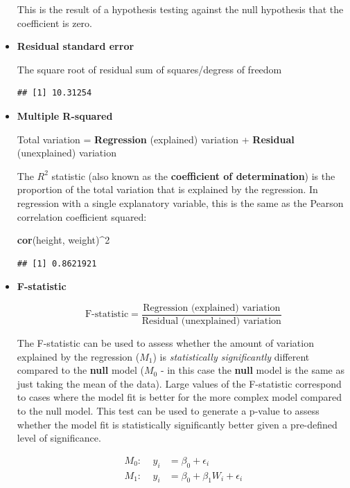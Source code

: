 \documentclass[]{book}
\newenvironment{Shaded}{\begin{snugshade}}{\end{snugshade}}
\newcommand{\KeywordTok}[1]{\textcolor[rgb]{0.13,0.29,0.53}{\textbf{#1}}}
\newcommand{\DecValTok}[1]{\textcolor[rgb]{0.00,0.00,0.81}{#1}}
\newcommand{\StringTok}[1]{\textcolor[rgb]{0.31,0.60,0.02}{#1}}
\newcommand{\OperatorTok}[1]{\textcolor[rgb]{0.81,0.36,0.00}{\textbf{#1}}}
\newcommand{\NormalTok}[1]{#1}
\theoremstyle{definition}
\theoremstyle{definition}
\theoremstyle{definition}
\theoremstyle{remark}
\begin{document}
\begin{itemize}
  This is the result of a hypothesis testing against the null hypothesis
  that the coefficient is zero.
\item
  \textbf{Residual standard error}

  The square root of residual sum of squares/degress of freedom

\begin{Shaded}
\end{Shaded}

\begin{verbatim}
## [1] 10.31254
\end{verbatim}
\item
  \textbf{Multiple R-squared}

  Total variation = \textbf{Regression} (explained) variation +
  \textbf{Residual} (unexplained) variation

  The \(R^2\) statistic (also known as the \textbf{coefficient of
  determination}) is the proportion of the total variation that is
  explained by the regression. In regression with a single explanatory
  variable, this is the same as the Pearson correlation coefficient
  squared:

\begin{Shaded}
\begin{Highlighting}[]
\KeywordTok{cor}\NormalTok{(height, weight)}\OperatorTok{^}\DecValTok{2}
\end{Highlighting}
\end{Shaded}

\begin{verbatim}
## [1] 0.8621921
\end{verbatim}
\item
  \textbf{F-statistic}

  \[
  \text{F-statistic} = \frac{\text{Regression (explained) variation}}{\text{Residual (unexplained) variation}}
  \]

  The F-statistic can be used to assess whether the amount of variation
  explained by the regression (\(M_1\)) is \emph{statistically
  significantly} different compared to the \textbf{null} model (\(M_0\)
  - in this case the \textbf{null} model is the same as just taking the
  mean of the data). Large values of the F-statistic correspond to cases
  where the model fit is better for the more complex model compared to
  the null model. This test can be used to generate a p-value to assess
  whether the model fit is statistically significantly better given a
  pre-defined level of significance.

  \[
  \begin{aligned}
  M_0:~~~~~y_i &= \beta_0 + \epsilon_i\\  
  M_1:~~~~~y_i &= \beta_0 + \beta_1 W_i + \epsilon_i
  \end{aligned}
  \]
\end{itemize}
\end{document}
